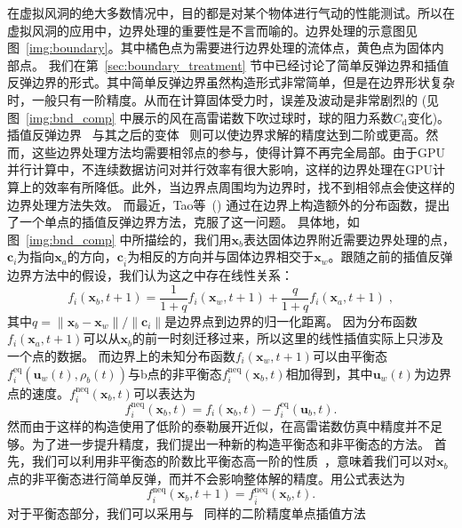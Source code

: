 在虚拟风洞的绝大多数情况中，目的都是对某个物体进行气动的性能测试。所以在虚拟风洞的应用中，边界处理的重要性是不言而喻的。边界处理的示意图见图~\ref{img:boundary}。其中橘色点为需要进行边界处理的流体点，黄色点为固体内部点。
我们在第~\ref{sec:boundary_treatment} 节中已经讨论了简单反弹边界和插值反弹边界的形式。其中简单反弹边界虽然构造形式非常简单，但是在边界形状复杂时，一般只有一阶精度。从而在计算固体受力时，误差及波动是非常剧烈的 (见图~\ref{img:bnd_comp} 中展示的风在高雷诺数下吹过球时，球的阻力系数$C_\text{d}$变化)。
插值反弹边界~\cite{Bouzidi-2001} 与其之后的变体~\cite{Yu-2003, Ginzburg-2003, Chun-2007} 则可以使边界求解的精度达到二阶或更高。然而，这些边界处理方法均需要相邻点的参与，使得计算不再完全局部。由于GPU并行计算中，不连续数据访问对并行效率有很大影响，这样的边界处理在GPU计算上的效率有所降低。此外，当边界点周围均为边界时，找不到相邻点会使这样的边界处理方法失效。
而最近，Tao等~(\citeyear{Tao-2018-b}) 通过在边界上构造额外的分布函数，提出了一个单点的插值反弹边界方法，克服了这一问题。
具体地，如图~\ref{img:bnd_comp} 中所描绘的，我们用$\bm{x}_{b}$表达固体边界附近需要边界处理的点，$\bm{c}_{i}$为指向$\bm{x}_{a}$的方向，$\bm{c}_{\bar{i}}$为相反的方向并与固体边界相交于$\bm{x}_{w}$。跟随之前的插值反弹边界方法中的假设，我们认为这之中存在线性关系：
\begin{equation}
f_i(\bm{x}_b, t\!+\!1) = \frac{1}{1+q}f_{i}(\bm{x}_w, t\!+\!1)+ \frac{q}{1+q}f_{i}(\bm{x}_a, t\!+\!1) \;,
\end{equation}
其中$q=\|\bm{x}_b - \bm{x}_w\|/\|\bm{c}_i\|$是边界点到边界的归一化距离。
因为分布函数$f_{i}(\bm{x}_a, t+1)$可以从$\bm{x}_b$的前一时刻迁移过来，所以这里的线性插值实际上只涉及一个点的数据。
而边界上的未知分布函数$f_{i}(\bm{x}_w, t\!+\!1)$可以由平衡态$f_{i}^\text{eq}(\bm{u}_w(t), \rho_b(t))$与b点的非平衡态$f_{i}^\text{neq}(\bm{x}_b, t)$相加得到，其中$\bm{u}_w(t)$为边界点的速度。$f_{i}^\text{neq}(\bm{x}_b, t)$可以表达为
\begin{equation}
f_{i}^\text{neq}(\bm{x}_b, t) = f_{i}(\bm{x}_b, t) - f_{i}^\text{eq}(\bm{u}_b, t).
\end{equation}
然而由于这样的构造使用了低阶的泰勒展开近似，在高雷诺数仿真中精度并不足够。为了进一步提升精度，我们提出一种新的构造平衡态和非平衡态的方法。
首先，我们可以利用非平衡态的阶数比平衡态高一阶的性质~\cite{Chun-2007}，意味着我们可以对$\bm{x}_b$点的非平衡态进行简单反弹，而并不会影响整体解的精度。用公式表达为
\begin{equation}
\label{eq:neq_bb}
f^\text{neq}_{i}(\bm{x}_b, t\!+\!1) = f^\text{neq}_{\bar{i}}(\bm{x}_b, t).
\end{equation}
对于平衡态部分，我们可以采用与~\cite{Tao-2018-b} 同样的二阶精度单点插值方法
